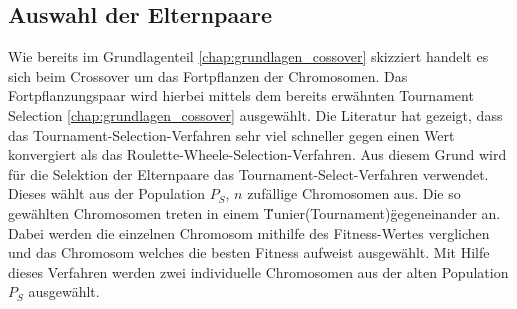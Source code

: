 \subsection{Auswahl der Elternpaare}

Wie bereits im Grundlagenteil \ref{chap:grundlagen_cossover} skizziert handelt es sich beim Crossover um das Fortpflanzen der Chromosomen.
Das Fortpflanzungspaar wird hierbei mittels dem bereits erwähnten Tournament Selection \ref{chap:grundlagen_cossover} ausgewählt. Die Literatur \cite{zhong2005comparison} hat gezeigt, dass das Tournament-Selection-Verfahren sehr viel schneller gegen einen Wert konvergiert als das Roulette-Wheele-Selection-Verfahren. Aus diesem Grund wird für die Selektion der Elternpaare das Tournament-Select-Verfahren verwendet. Dieses wählt aus der Population $P_S$, $n$ zufällige Chromosomen aus. Die so gewählten Chromosomen treten in einem \"Tunier(Tournament)\" gegeneinander an. Dabei werden die einzelnen Chromosom mithilfe des Fitness-Wertes verglichen und das Chromosom welches die besten Fitness aufweist ausgewählt. Mit Hilfe dieses Verfahren werden zwei individuelle Chromosomen aus der alten Population $P_S$ ausgewählt.
 
